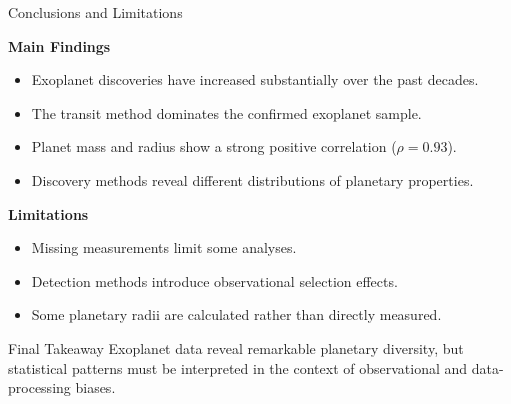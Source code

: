 \documentclass[aspectratio=169,11pt]{beamer}
\begin{document}
\begin{frame}{Conclusions and Limitations}
	
	\textbf{Main Findings}
	\begin{itemize}
		\item Exoplanet discoveries have increased substantially
		over the past decades.
		\item The transit method dominates the confirmed
		exoplanet sample.
		\item Planet mass and radius show a strong positive
		correlation ($\rho = 0.93$).
		\item Discovery methods reveal different distributions
		of planetary properties.
	\end{itemize}
	
	\vspace{0.3cm}
	
	\textbf{Limitations}
	\begin{itemize}
		\item Missing measurements limit some analyses.
		\item Detection methods introduce observational
		selection effects.
		\item Some planetary radii are calculated rather
		than directly measured.
	\end{itemize}
	
	\vfill
	
	\begin{block}{Final Takeaway}
		Exoplanet data reveal remarkable planetary diversity,
		but statistical patterns must be interpreted in the
		context of observational and data-processing biases.
	\end{block}
	
\end{frame}
\end{document}
